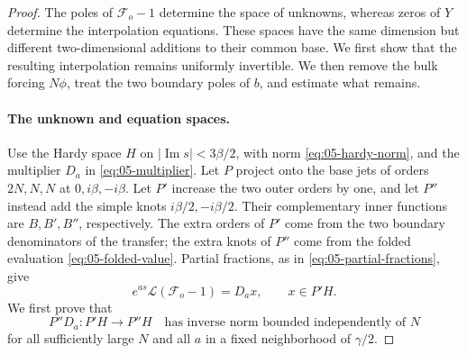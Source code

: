 \begin{proof}
The poles of \(\mathcal F_o-1\) determine the space of unknowns, whereas
zeros of \(Y\) determine the interpolation equations. These spaces have
the same dimension but different two-dimensional additions to their
common base. We first show that the resulting interpolation remains
uniformly invertible. We then remove the bulk forcing \(N\phi\), treat
the two boundary poles of \(b\), and estimate what remains.

\paragraph{The unknown and equation spaces.}
Use the Hardy space \(H\) on \( |\operatorname{Im}s|<3\beta/2\),
with norm \eqref{eq:05-hardy-norm}, and the multiplier \(D_a\) in
\eqref{eq:05-multiplier}. Let \(P\) project
onto the base jets of orders \(2N,N,N\) at \(0,i\beta,-i\beta\).
Let \(P'\) increase the two outer orders by one, and let \(P''\) instead
add the simple knots \(i\beta/2,-i\beta/2\). Their complementary inner
functions are \(B,B',B''\), respectively. The extra orders of \(P'\)
come from the two boundary denominators of the transfer; the extra knots
of \(P''\) come from the folded evaluation \eqref{eq:05-folded-value}.
Partial fractions, as in \eqref{eq:05-partial-fractions}, give
\begin{equation}
 e^{as}\mathscr L(\mathcal F_o-1)=D_ax,\qquad x\in P'H.
 \label{eq:05-open-partial-fractions}
\end{equation}
We first prove that
\begin{equation}
 P''D_a:P'H\longrightarrow P''H
 \quad\text{has inverse norm bounded independently of }N
 \label{eq:05-open-inverse}
\end{equation}
for all sufficiently large \(N\) and all \(a\) in a fixed neighborhood of \(\gamma/2\).


\end{proof}
